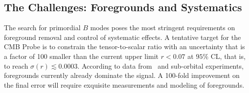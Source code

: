 

\subsection{The Challenges: Foregrounds and Systematics}
\label{sec:foregrounds_systematics}

\vspace{-0.05in}
The search for primordial $B$ modes poses the most stringent requirements on foreground removal and control of systematic effects. A tentative target for the CMB Probe is to constrain the tensor-to-scalar ratio with an 
uncertainty that is a factor of 100 smaller than the current upper limit \mbox{$r < 0.07$} at $95\%$ CL, that is, to reach 
$\sigma(r)\lesssim0.0003$. According to data from \planck\ and 
sub-orbital experiments, foregrounds currently already dominate the signal. A 100-fold improvement 
on the final error will require exquisite measurements and modeling of foregrounds. 
